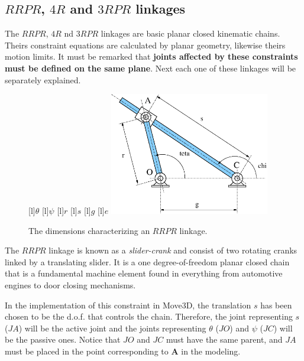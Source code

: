 \subsection*{$RRPR$, $4R$ and $3RPR$ linkages}

The $RRPR$, $4R$ nd $3RPR$ linkages are basic planar closed kinematic
chains. Theirs constraint equations are calculated by planar geometry,
likewise theirs motion limits. It must be remarked that {\bf joints
  affected by these constraints must be defined on the same plane}.
Next each one of these linkages will be separately explained.

\begin{figure}[ht!]
\begin{center}
[l]{$\theta$} 
[l]{$\psi$}
[l]{$r$}
[l]{$s$}
[l]{$g$}
[l]{$e$}
  \includegraphics[width=7.0cm]{FIG/Constraint/RRPR2.eps}
\end{center}
\caption{\label{fig:RRPR} The dimensions characterizing an $RRPR$
linkage.}
\end{figure}


The $RRPR$ linkage is known as a {\em slider-crank} and consist of two
rotating cranks linked by a translating slider. It is a one
degree-of-freedom planar closed chain that is a fundamental machine
element found in everything from automotive engines to door closing
mechanisms.

In the implementation of this constraint in Move3D, the
translation $s$ has been chosen to be the d.o.f. that controls the chain. Therefore,
the joint representing $s$ ($JA$) will be the active joint and the joints
representing $\theta$ ($JO$) and $\psi$ ($JC$) will be the passive
ones. Notice that $JO$ and $JC$ must have the same parent, and $JA$
must be placed in the point corresponding to {\bf A} in the modeling.

